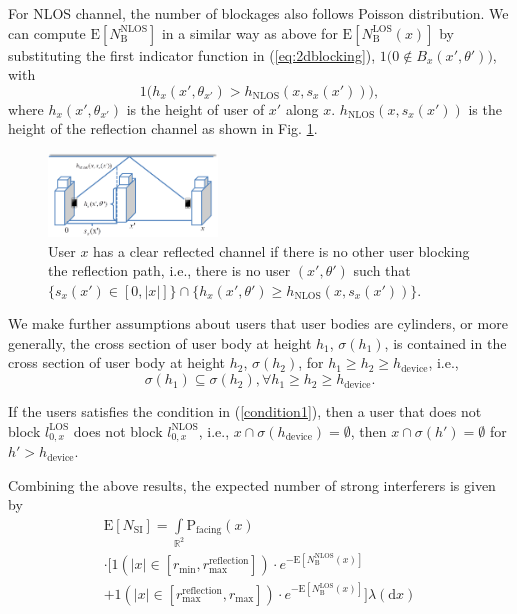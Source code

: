 \documentclass[10pt, conference, letterpaper]{IEEEtran}
\begin{document}
For NLOS channel, the number of blockages also follows Poisson distribution. We can compute $\mathrm{E}[N_{\mathrm{B}}^{\mathrm{NLOS}}]$ in a similar way as above for  $\mathrm{E}[N_{\mathrm{B}}^\mathrm{LOS}(x)]$ by substituting the first indicator function in (\ref{eq:2dblocking}), $\mathrm{1}\big(0\notin B_x(x',\theta')\big)$, with 
$$\mathrm{1}\big(h_{x}(x',\theta_{x'}) > h_{\mathrm{NLOS}}(x, s_x(x'))  \big),$$
where $h_{x}(x',\theta_{x'}) $ is the height of user of $x'$ along $x$. $h_{\mathrm{NLOS}}(x, s_x(x'))$ is the height of the reflection channel as shown in Fig. \ref{fig:NLOS}. 
\begin{figure}
	\centering
	\includegraphics[width = 0.4\textwidth]{Channel_NLOS.pdf}
	\caption{User $x$ has a clear reflected channel if there is no other user blocking the reflection path, i.e., there is no user $(x',\theta')$ such that $\{s_x(x')\in [0, |x|]\}\cap\{ h_x(x', \theta') \geq h_{\mathrm{NLOS}}(x, s_x(x'))\}$.}
	\label{fig:NLOS}
\end{figure}

We make further assumptions about users that user bodies are cylinders, or more generally, the cross section of user body at height $h_1$, $\sigma(h_1)$, is contained in the cross section of user body at height $h_2$, $\sigma(h_2)$, for $h_1\geq h_2\geq h_{\mathrm{device}}$, i.e., 
\begin{equation}\label{condition1}
\sigma(h_1)\subseteq \sigma(h_2), \forall h_1\geq h_2\geq h_{\mathrm{device}}.
\end{equation}

If the users satisfies the condition in (\ref{condition1}), then a user that does not block $l_{0,x}^{\mathrm{LOS}}$ does not block $l_{0,x}^{\mathrm{NLOS}}$, i.e., $x\cap \sigma(h_{\mathrm{device}}) = \emptyset$, then $x\cap \sigma(h') = \emptyset$ for $h'>h_{\mathrm{device}}$.

Combining the above results, the expected number of strong interferers is given by 
\begin{multline}\label{eq:E_N_SI}
	\mathrm{E}[N_{\mathrm{SI}}] =  \int\limits_{\mathbb{R}^2}
	\mathrm{P}_{\text{facing}}(x)\\
	\cdot \big[\text{1}(|x|\in[r_{\min},r_{\text{max}}^{\mathrm{reflection}}])
	\cdot e^{-\mathrm{E}[N_{\mathrm{B}}^\mathrm{NLOS}(x)]} \\
	 + \text{1}(|x|\in[r_{\text{max}}^{\mathrm{reflection}},r_{\text{max}}])
	 \cdot e^{-\mathrm{E}[N_{\mathrm{B}}^\mathrm{LOS}(x)]} \big]\lambda(\mathrm{d}x)
\end{multline}
\end{document}
